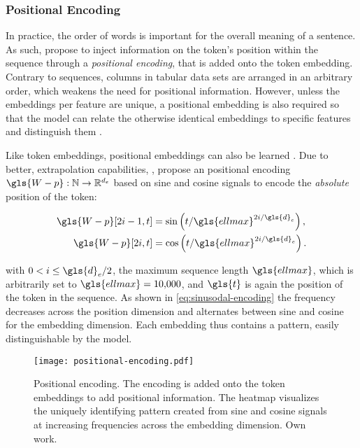 \subsubsection{Positional Encoding}\label{sec:positional-encoding}

In practice, the order of words is important for the overall meaning of a sentence. As such, \textcite[][6]{vaswaniAttentionAllYou2017} propose to inject information on the token's position within the sequence through a \emph{positional encoding}, that is added onto the token embedding. Contrary to sequences, columns in tabular data sets are arranged in an arbitrary order, which weakens the need for positional information. However, unless the embeddings per feature are unique, a positional embedding is also required so that the model can relate the otherwise identical embeddings to specific features and distinguish them \autocites[][3]{huangTabTransformerTabularData2020}[][15]{somepalliSAINTImprovedNeural2021}.

Like token embeddings, positional embeddings can also be learned \autocite[cp.][4174]{devlinBERTPretrainingDeep2019}. Due to better, extrapolation capabilities, \textcite[][6]{vaswaniAttentionAllYou2017}, propose an positional encoding $\gls{W-p}: \mathbb{N} \rightarrow \mathbb{R}^{d_{e}}$ based on sine and cosine signals to encode the \emph{absolute} position of the token:

\begin{equation}
    \begin{aligned}
        \gls{W-p}[2 i-1, t] & =\sin \left(t / \gls{ellmax}^{2 i / \gls{d}_e}\right), \\
        \gls{W-p}[2 i, t]   & =\cos \left(t / \gls{ellmax}^{2 i / \gls{d}_e}\right).
    \end{aligned}
    \label{eq:sinusodal-encoding}
\end{equation}

with $0<i \leq \gls{d}_{e} / 2$, the maximum sequence length $\gls{ellmax}$, which is arbitrarily set to $\gls{ellmax}=10{,}000$, and $\gls{t}$ is again the position of the token in the sequence. As shown in \cref{eq:sinusodal-encoding} the frequency decreases across the position dimension and alternates between sine and cosine for the embedding dimension. Each embedding thus contains a pattern, easily distinguishable by the model.

\begin{figure}[ht]
    \centering
    \texttt{[image: positional-encoding.pdf]}
    \caption[Positional Encoding]{Positional encoding. The encoding is added onto the token embeddings to add positional information. The heatmap visualizes the uniquely identifying pattern created from sine and cosine signals at increasing frequencies across the embedding dimension. Own work.}
    \label{fig:positional-embedding}
\end{figure}

